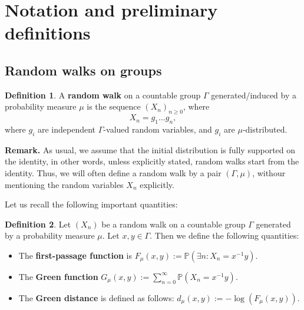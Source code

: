 \documentclass[11pt]{amsart}
\theoremstyle{definition}
\newtheorem{definition}{Definition}[section]
\begin{document}
	\section{Notation and preliminary definitions}
		\subsection{Random walks on groups}
			\begin{definition}
				A \textbf{random walk} on a countable group $\Gamma$ generated/induced by a probability measure $\mu$ is the sequence $(X_n)_{n \ge 0}$, where 
				\[
				X_n = g_1 \dots g_n,
				\]
				where $g_i$ are independent $\Gamma$-valued random variables, and $g_i$ are $\mu$-distributed.
			\end{definition}
			\textbf{Remark.} As usual, we assume that the initial distribution is fully supported on the identity, in other words, unless explicitly stated, random walks start from the identity. Thus, we will often define a random walk by a pair $(\Gamma, \mu)$, withour mentioning the random variables $X_n$ explicitly.
	
			Let us recall the following important quantities:
			\begin{definition}
				Let $(X_n)$ be a random walk on a countable group $\Gamma$ generated by a probability measure $\mu$. Let $x, y \in \Gamma$. Then we define the following quantities:
				\begin{itemize}
					\item The \textbf{first-passage function} is $F_\mu(x, y) := \mathbb{P}(\exists n : X_n = x^{-1} y)$.
					\item The \textbf{Green function} $G_\mu(x, y) := \sum_{n=0}^{\infty} \mathbb{P}(X_n = x^{-1} y)$.
					\item The \textbf{Green distance} is defined as follows: $d_\mu(x, y) := - \log(F_\mu(x, y))$.
				\end{itemize} 
			\end{definition}
			
\end{document}
